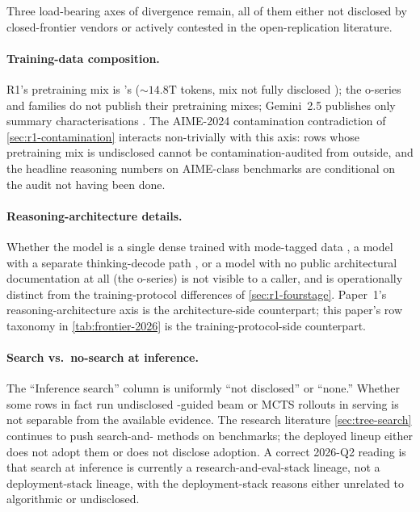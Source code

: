 Three load-bearing axes of divergence remain, all of them either not
disclosed by closed-frontier vendors or actively contested in the
open-replication literature.

\paragraph{Training-data composition.} R1's pretraining mix is
's ($\sim\!14.8\text{T}$ tokens, mix not fully disclosed
\citep[\S 2]{deepseek-r1}); the o-series and  families do not
publish their pretraining mixes; Gemini~2.5 publishes only summary
characterisations . The AIME-2024 contamination
contradiction of \cref{sec:r1-contamination} interacts non-trivially
with this axis: rows whose pretraining mix is undisclosed cannot be
contamination-audited from outside, and the headline reasoning numbers
on AIME-class benchmarks are conditional on the audit not having been
done.

\paragraph{Reasoning-architecture details.} Whether the model is a
single dense  trained with mode-tagged data
, a model with a separate thinking-decode
path , or a model with no
public architectural documentation at all (the o-series) is not
visible to a caller, and is operationally distinct from the
training-protocol differences of \cref{sec:r1-fourstage}. Paper~1's
reasoning-architecture axis is the architecture-side counterpart;
this paper's row taxonomy in \cref{tab:frontier-2026} is the
training-protocol-side counterpart.

\paragraph{Search vs.\ no-search at inference.} The ``Inference
search'' column is uniformly ``not disclosed'' or ``none.'' Whether
some rows in fact run undisclosed -guided beam or MCTS rollouts in
serving is not separable from the available evidence. The research
literature \cref{sec:tree-search} continues to push search-and-
methods on benchmarks; the deployed lineup either does not adopt them
or does not disclose adoption. A correct 2026-Q2 reading is that
search at inference is currently a research-and-eval-stack lineage,
not a deployment-stack lineage, with the deployment-stack reasons
either unrelated to algorithmic  or undisclosed.

